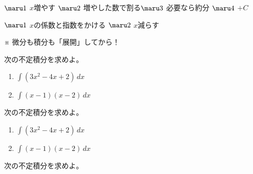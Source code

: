 


\begin{multicols*}{4}
 
 
 \columnbreak{}
 
 \vfill
 
 \begin{thmBlock}
   $\maru1$ $x$増やす $\maru2$ 増やした数で割る$\maru3$ 必要なら約分 $\maru4$ $+C$
  
   $\maru1$ $x$の係数と指数をかける $\maru2$ $x$減らす
  
  ※ 微分も積分も「展開」してから！
 \end{thmBlock}
 
 次の不定積分を求めよ。
 
 \begin{enumerate}
  \item $\displaystyle\int (3x^2-4x+2)\,dx$
	\vfill
  \item $\displaystyle\int (x-1)(x-2)\,dx$
	\vfill
 \end{enumerate}
 \null
 
 \columnbreak{}
 
 次の不定積分を求めよ。
 
 \begin{enumerate}
  \item $\displaystyle\int (3x^2-4x+2)\,dx$
	\begin{ansBlockSize}{8}
	\end{ansBlockSize}
  \item $\displaystyle\int (x-1)(x-2)\,dx$
	\begin{ansBlockSize}{12}
	\end{ansBlockSize}
 \end{enumerate}
 
 次の不定積分を求めよ。
 

\end{multicols*}
